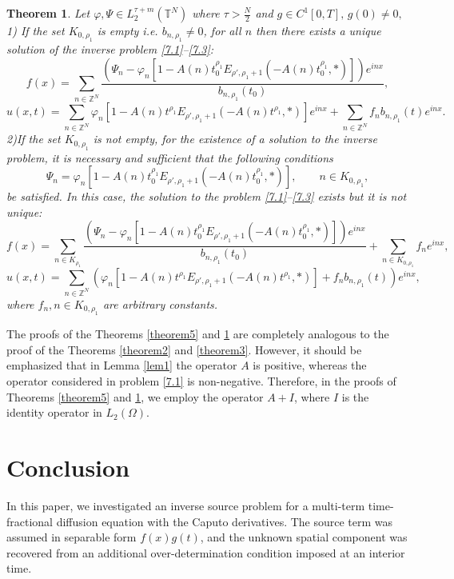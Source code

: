 \documentclass[12pt, reqno]{amsart}
\newtheorem{theorem}{Theorem}[section]
\theoremstyle{definition}
\theoremstyle{remark}
\numberwithin{equation}{section}
\begin{document}
\begin{theorem}\label{theorem6}
    Let $\varphi, \Psi \in L_2^{\tau +m}(\mathbb{T}^N)$ where $\tau>\frac{N}{2}$ and $g\in C^1[0,T], \, g(0)\neq 0,$\\
    1) If the set $K_{0,\rho_1}$ is empty i.e. $b_{n,\rho_1}\neq 0$, for all $n$ then there exists a unique solution of the inverse problem \eqref{7.1}--\eqref{7.3}:
    $$
    f(x)=\sum_{n\in \mathbb{Z}^N} \frac{\left(\Psi_n-\varphi_n \left[ 1 - A(n) t_0^{\rho_1} E_{ \rho', \rho_1 + 1} \left( -A(n) t_0^{\rho_1}, * \right) \right]\right)e^{inx}  }{b_{n,\rho_1}(t_0)},
    $$
    $$
    u(x,t)= \sum_{n\in \mathbb{Z}^N}\varphi_n \left[ 1 - A(n) t^{\rho_1} E_{ \rho', \rho_1 + 1} \left( -A(n) t^{\rho_1}, * \right) \right]e^{inx}+\sum_{n\in\mathbb{Z}^N}f_
    n b_{n,\rho_1}(t) e^{inx}.
    $$
    2)If the set $K_{0,\rho_1}$ is not empty, for the existence of a solution to the inverse problem, it is necessary and sufficient that the following conditions
    $$
    \Psi_n=\varphi_n \left[ 1 - A(n) t_0^{\rho_1} E_{ \rho', \rho_1 + 1} \left( -A(n) t_0^{\rho_1}, * \right) \right],
\quad\quad n\in K_{0,\rho_1},    $$
    be satisfied. In this case, the solution to the problem \eqref{7.1}--\eqref{7.3}  exists but it is not unique: 
 $$
    f(x)=\sum_{n\in K_{\rho_1}} \frac{\left(\Psi_n-\varphi_n \left[ 1 - A(n) t_0^{\rho_1} E_{ \rho', \rho_1 + 1} \left( -A(n) t_0^{\rho_1}, * \right) \right]\right)e^{inx}  }{b_{n,\rho_1}(t_0)}+\sum_{n\in K_{0,\rho_1}}f_ne^{inx},
 $$
 $$
    u(x,t)= \sum_{n\in \mathbb{Z}^N}\left(\varphi_n \left[ 1 - A(n) t^{\rho_1} E_{ \rho', \rho_1 + 1} \left( -A(n) t^{\rho_1}, * \right) \right] +f_n b_{n,\rho_1}(t)\right)e^{inx},
    $$
    where $f_n, n\in K_{0,\rho_1}$ are arbitrary constants.
\end{theorem}
The proofs of the Theorems \ref{theorem5} and \ref{theorem6} are completely analogous to the proof of the Theorems \ref{theorem2} and \ref{theorem3}. However, it should be emphasized that in Lemma \ref{lem1} the operator $A$ is positive,
whereas the operator considered in problem \eqref{7.1} is non-negative.
Therefore, in the proofs of Theorems \ref{theorem5} and \ref{theorem6}, we employ the operator $A + I$,
where $I$ is the identity operator in $L_2(\Omega)$.


\section{Conclusion}\label{sec:8}


In this paper, we investigated an inverse source problem for a multi-term time-fractional diffusion equation with the Caputo derivatives. The source term was assumed in separable form $f(x)g(t)$, and the unknown spatial component was recovered from an additional over-determination condition imposed at an interior time.
\end{document}
